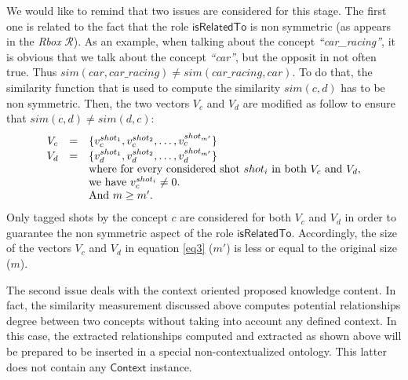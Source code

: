 			We would like to remind that two issues are considered for this stage. 
			The first one is related to the fact that the role $\mathsf{isRelatedTo}$ is non symmetric 
			(as appears in the \emph{Rbox} $\mathcal{R}$). 
			As an example, when talking about the concept \emph{``car\_racing''}, 
			it is obvious that we talk about the concept \emph{``car''}, but  the opposit 
			in not often true. Thus $sim(car,car\_racing) \neq sim(car\_racing ,car)$.
			To do that, the similarity function that is used to compute the similarity $sim(c,d)$ has
			to be non symmetric. 
			Then, the two vectors $V_{c}$ and $V_{d}$ are modified as follow to ensure that  
			$sim(c,d) \neq sim(d,c)$:
			\begin{equation}
			\label{eq3}
			\begin{array}{ c c l }
			V_{c} & = & \{v^{shot_{1}}_{c},v^{shot_{2}}_{c}, \dots, v^{shot_{m'}}_{c}\}\\
			V_{d} & = & \{v^{shot_{1}}_{d},v^{shot_{2}}_{d}, \dots, v^{shot_{m'}}_{d}\}\\
			& & \text{where for every considered shot } shot_{i} \text{ in both } V_{c} \text{ and } V_{d},\\
			& & \text{we have } v^{shot_{i}}_{c}\neq 0.\\
			& & \text{And } m \geq m'. 
			\end{array}
			\end{equation}
			Only tagged shots by the concept $c$ are considered for both $V_{c}$ 
			and $V_{d}$ in order to guarantee the non symmetric aspect of the role $\mathsf{isRelatedTo}$.
			Accordingly, the size of the vectors $V_{c}$ and $V_{d}$ in equation
			\ref{eq3} ($m'$) is less or equal to the original size ($m$).
			
			The second issue deals with the context oriented proposed knowledge content. 
			In fact, the similarity measurement discussed above computes
			potential relationships degree between 
			two concepts without taking into account any defined context. 
			In this case, the extracted relationships 
			computed and extracted as shown above will be prepared to be inserted in a special non-contextualized 
			ontology. This latter does not contain any $\mathsf{Context}$ instance.
		
